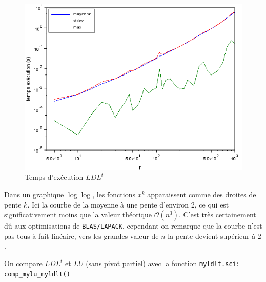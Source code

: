 \documentclass{article}
\begin{document}
\begin{figure}[H]
\caption{Temps d'exécution \(LDL^t\)}
\centering
\includegraphics[scale=0.80]{time_LDLt}
\end{figure}
Dans un graphique \(\log\log\), les fonctions \(x^k\) apparaissent comme des droites de pente \(k\). Ici la courbe de la moyenne à une pente d'environ \(2\), ce qui est significativement moins que la valeur théorique \(\mathcal{O}(n^3)\). C'est très certainement dû aux optimisations de \texttt{BLAS/LAPACK}, cependant on remarque que la courbe n'est pas tous à fait linéaire, vers les grandes valeur de \(n\) la pente devient supérieur à \(2\).

On compare \(LDL^t\) et \(LU\) (sans pivot partiel) avec la fonction \texttt{myldlt.sci: comp\_mylu\_myldlt()}
\end{document}

